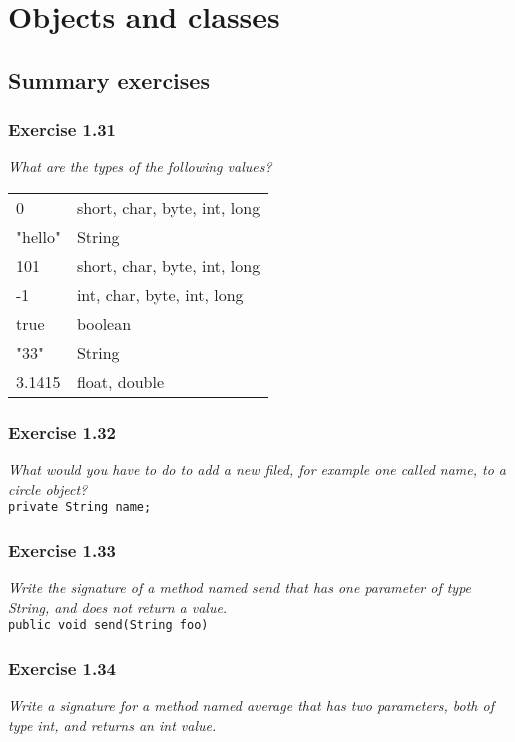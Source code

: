 \section{Objects and classes}

\subsection{Summary exercises}

\subsubsection*{Exercise 1.31}
\textit{What are the types of the following values?}\\

\begin{tabular}{ l l }
	0	& short, char, byte, int, long 	\\
	"hello"	& String			\\
	101	& short, char, byte, int, long	\\
	-1	& int, char, byte, int, long	\\
	true	& boolean			\\
	"33"	& String			\\
	3.1415	& float, double			\\
\end{tabular}

\subsubsection*{Exercise 1.32}
\textit{What would you have to do to add a new filed, for example one called 
	name, to a circle object?}\\

\lstinline{private String name;}

\subsubsection*{Exercise 1.33}
\textit{Write the signature of a method named send that has one parameter of 
	type String, and does not return a value.}\\

\lstinline{public void send(String foo)}

\subsubsection*{Exercise 1.34}
\textit{Write a signature for a method named average that has two parameters,
	both of type int, and returns an int value.}\\

